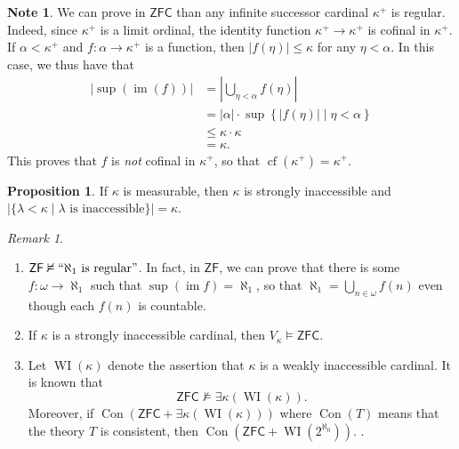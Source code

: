 \documentclass[10pt,letterpaper,cm]{nupset}
\theoremstyle{definition}
\newtheorem{note}[definition]{Note}
\theoremstyle{theorem}
\newtheorem{prop}[definition]{Proposition}
\theoremstyle{remark}
\newtheorem{remark}[definition]{Remark}
\newcommand{\1}{\mathbf{1}}
\newcommand{\0}{\vec 0}
\newcommand{\zf}{\mathsf{ZF}}
\newcommand{\zfc}{\mathsf{ZFC}}
\DeclareMathOperator{\im}{im}
\DeclareMathOperator{\cf}{cf}
\DeclareMathOperator{\wi}{WI}
\DeclareMathOperator{\con}{Con}
\begin{document}
\begin{note}
We can prove in $\zfc$ than any infinite successor cardinal $\kappa^+$ is regular. Indeed, since $\kappa^+$ is a limit ordinal, the identity function $\kappa^+ \to \kappa^+$ is cofinal in $\kappa^+$. If $\alpha < \kappa^+$ and $f : \alpha \to \kappa^+$ is a function, then $\left\lvert{f(\eta)}\right\rvert \leq \kappa$ for any $\eta < \alpha$. In this case, we thus have that
\begin{align*}
\left\lvert{\sup(\im(f))}\right\rvert & = \left\lvert{\bigcup_{\eta < \alpha}f(\eta)}\right\rvert
\\ & = \left\lvert{\alpha}\right\rvert \cdot \sup\left\{\left\lvert{f(\eta)}\right\rvert \mid \eta < \alpha\right\}
\\ & \leq \kappa \cdot \kappa
\\ & = \kappa
.\end{align*} This proves that  $f$ is \emph{not} cofinal in $\kappa^+$, so that $\cf(\kappa^+) = \kappa^+$.
\end{note}

\begin{prop} 
 If $\kappa$ is measurable, then $\kappa$ is strongly inaccessible and $\left\lvert{\{\lambda < \kappa \mid \lambda \text{ is inaccessible}\}}\right\rvert = \kappa$.
\end{prop}

\begin{remark} $ $
\begin{enumerate}
\item $\zf \nvDash ``\aleph_1 \text{ is regular}"$. In fact, in $\zf$, we can prove that there is some $f: \omega \to \aleph_1$ such that $\sup(\im{f}) = \aleph_1$, so that $\aleph_1 = \bigcup_{n \in \omega} f(n)$ even though each $f(n)$ is countable. 
\item If $\kappa$ is a strongly inaccessible cardinal, then $V_{\kappa} \models \zfc$.
\item  Let $\wi(\kappa)$ denote the assertion that $\kappa$ is a weakly inaccessible cardinal. It is known that $$\zfc \nvDash \exists{\kappa}(\wi(\kappa)).$$ Moreover, if $\con(\zfc + \exists{\kappa}(\wi(\kappa)))$ where $\con(T)$ means that the theory $T$ is consistent, then $\con(\zfc + \wi(2^{\aleph_0}))$.     . 
\end{enumerate}
\end{remark}
\end{document}
